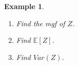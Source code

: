 \documentclass[12pt]{amsart}
\newtheorem{example}[theorem]{Example}
\newcommand\Ebb{\mathbb{E}}
\begin{document}
{\begin{example}
\begin{enumerate}
\item Find the mgf of $Z$.

\vfill

\item Find $\Ebb[Z]$.

\vspace{4cm}

\item Find $Var(Z)$.

\vspace{3cm}
\end{enumerate}

\end{example}





}  %
\end{document}
